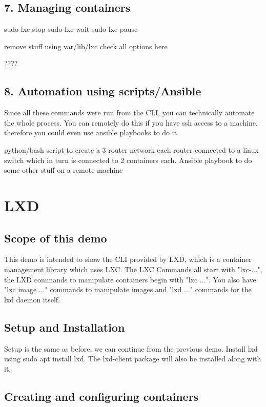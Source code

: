 \documentclass{report}
\begin{document}
\section*{7. Managing containers}
		sudo lxc-stop
		sudo lxc-wait
		sudo lxc-pause
		
		remove stuff using var/lib/lxc
		check all options here

		????

\section*{8. Automation using scripts/Ansible}

		Since all these commands were run from the CLI, you can technically automate the whole process. You can remotely do this if you have ssh access to a machine. therefore you could even use ansible playbooks to do it. 

		python/bash script to create a 3 router network each router connected to a linux switch which in turn is connected to 2 containers each.
		Ansible playbook to do some other stuff on a remote machine
		


\chapter*{LXD}
\section*{Scope of this demo}
		This demo is intended to show the CLI provided by LXD, which is a container management library which uses LXC. The LXC Commands all start with "lxc-...", the LXD commands to manipulate containers begin with "lxc ...". You also have "lxc image ..." commands to manipulate images and "lxd ..." commands for the lxd daemon itself.

\section*{Setup and Installation}
		Setup is the same as before, we can continue from the previous demo. Install lxd using sudo apt install lxd. The lxd-client package will also be installed along with it.
\section*{Creating and configuring containers}
		
\end{document}
